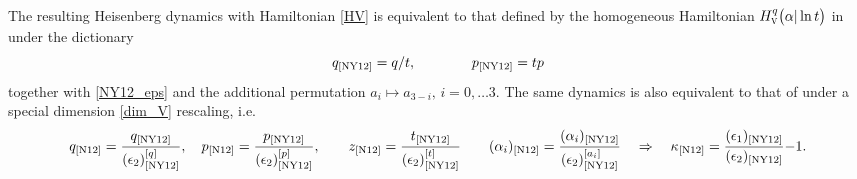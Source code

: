 \documentclass[12pt,a4paper]{article}
\numberwithin{equation}{section}
\newcommand{\V}{\scalebox{.6}{V}}
\begin{document}
The resulting Heisenberg dynamics with Hamiltonian \eqref{HV} is
equivalent to that defined by the homogeneous Hamiltonian $H^q_{\V}\big(\alpha|\ln t\big)$ in \cite[Sec. 2.2]{NY12} under the dictionary
\begin{equation}
q_{\textrm{\cite{NY12}}}=q/t, \qquad \qquad 
p_{\textrm{\cite{NY12}}}=tp  
\end{equation}
together with \eqref{NY12_eps} and the additional permutation $a_i\mapsto a_{3-i},\, {\scriptstyle i=0,\ldots 3}$. The same dynamics is also equivalent to that of
\cite[Sec. 3]{N12} under a special dimension \eqref{dim_V} rescaling, i.e.
\begin{equation}\label{5to9}
q_{\textrm{\cite{N12}}}=\frac{q_{\textrm{\cite{NY12}}}}{(\epsilon_2)^{[q]}_{\textrm{\cite{NY12}}}}, \quad
p_{\textrm{\cite{N12}}}=\frac{p_{\textrm{\cite{NY12}}}}{(\epsilon_2)^{[p]}_{\textrm{\cite{NY12}}}}, \qquad z_{\textrm{\cite{N12}}}=\frac{t_{\textrm{\cite{NY12}}}}{(\epsilon_2)^{[t]}_{\textrm{\cite{NY12}}}} \qquad  (\alpha_i)_{\textrm{\cite{N12}}}=\frac{(\alpha_i)_{\textrm{\cite{NY12}}}}{(\epsilon_2)^{[a_i]}_{\textrm{\cite{NY12}}}} \quad \Rightarrow \quad \kappa_{\textrm{\cite{N12}}}=\frac{(\epsilon_1)_{\textrm{\cite{NY12}}}}{(\epsilon_2)_{\textrm{\cite{NY12}}}}{-}1. 
\end{equation}
\end{document}
